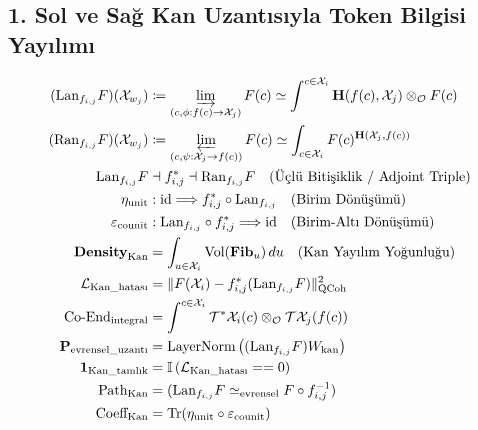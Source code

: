 \documentclass[11pt, a4paper]{article}
\begin{document}
\subsection{1. Sol ve Sağ Kan Uzantısıyla Token Bilgisi Yayılımı}
\begin{align}
(\text{Lan}_{f_{i,j}} F)(\mathcal{X}_{w_j}) &\coloneqq \varinjlim_{(c, \phi : f(c) \to \mathcal{X}_j)} F(c) \simeq \int^{c \in \mathcal{X}_i} \mathbf{H}(f(c), \mathcal{X}_j) \otimes_{\mathcal{O}} F(c) \\
(\text{Ran}_{f_{i,j}} F)(\mathcal{X}_{w_j}) &\coloneqq \varprojlim_{(c, \psi : \mathcal{X}_j \to f(c))} F(c) \simeq \int_{c \in \mathcal{X}_i} F(c)^{\mathbf{H}(\mathcal{X}_j, f(c))} \\
\text{Lan}_{f_{i,j}} F &\dashv f_{i,j}^* \dashv \text{Ran}_{f_{i,j}} F \quad (\text{Üçlü Bitişiklik / Adjoint Triple}) \\
\eta_{\text{unit}} &: \text{id} \Longrightarrow f_{i,j}^* \circ \text{Lan}_{f_{i,j}} \quad (\text{Birim Dönüşümü}) \\
\varepsilon_{\text{counit}} &: \text{Lan}_{f_{i,j}} \circ f_{i,j}^* \Longrightarrow \text{id} \quad (\text{Birim-Altı Dönüşümü}) \\
\mathbf{Density}_{\text{Kan}} &= \int_{u \in \mathcal{X}_i} \text{Vol}(\mathbf{Fib}_u) \, du \quad (\text{Kan Yayılım Yoğunluğu}) \\
\mathcal{L}_{\text{Kan\_hatası}} &= \| F(\mathcal{X}_i) - f_{i,j}^* (\text{Lan}_{f_{i,j}} F) \|_{\text{QCoh}}^2 \\
\text{Co-End}_{\text{integral}} &= \int^{c \in \mathcal{X}_i} \mathcal{T}^*\mathcal{X}_i(c) \otimes_{\mathcal{O}} \mathcal{T}\mathcal{X}_j(f(c)) \\
\mathbf{P}_{\text{evrensel\_uzantı}} &= \text{LayerNorm}\left( (\text{Lan}_{f_{i,j}} F) W_{\text{kan}} \right) \\
\mathbf{1}_{\text{Kan\_tamlık}} &= \mathbb{I}\left( \mathcal{L}_{\text{Kan\_hatası}} == 0 \right) \\
\text{Path}_{\text{Kan}} &= (\text{Lan}_{f_{i,j}} F \simeq_{\text{evrensel}} F \circ f_{i,j}^{-1}) \\
\text{Coeff}_{\text{Kan}} &= \text{Tr}(\eta_{\text{unit}} \circ \varepsilon_{\text{counit}})
\end{align}
\end{document}
